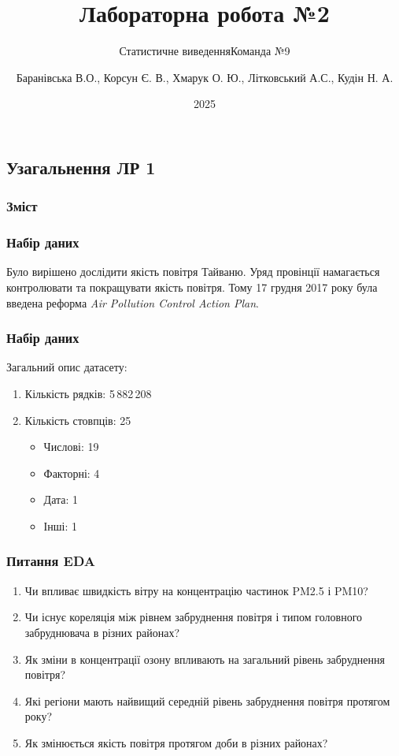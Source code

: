 \documentclass{beamer}
\title{Лабораторна робота №2}
\subtitle{Статистичне виведення}
\subtitle{Команда №9}
\author[]{
  Баранівська В.О.,
  Корсун Є. В.,
  Хмарук О. Ю.,
  Літковський А.С.,
  Кудін Н. А.
}
\date{2025}
\begin{document}
\frame{\titlepage}


\begin{frame}
  \section{Узагальнення ЛР 1}

  \frametitle{Зміст}
  \tableofcontents[currentsection]
\end{frame}

\begin{frame}
  \frametitle{Набір даних}

  Було вирішено дослідити якість повітря Тайваню. Уряд провінції намагається
  контролювати та покращувати якість повітря. Тому 17 грудня 2017 року була введена
  реформа \textit{Air Pollution Control Action Plan}.

  \begin{center}
    
  \end{center}
\end{frame}

\begin{frame}
  \frametitle{Набір даних}

  Загальний опис датасету:

  \begin{enumerate}
    \item Кількість рядків: 5\,882\,208
    \item Кількість стовпців: 25

    \begin{itemize}
      \item Числові: 19
      \item Факторні: 4
      \item Дата: 1
      \item Інші: 1
    \end{itemize}
  \end{enumerate}
\end{frame}

\begin{frame}
  \frametitle{Питання EDA}

  \begin{enumerate}
    \item Чи впливає швидкість вітру на концентрацію частинок PM2.5 і PM10?
    \item Чи існує кореляція між рівнем забруднення повітря і типом головного забруднювача
    в різних районах?
    \item Як зміни в концентрації озону  впливають на загальний рівень забруднення повітря?
    \item Які регіони мають найвищий середній рівень забруднення повітря протягом року?
    \item Як змінюється якість повітря протягом доби в різних районах?
  \end{enumerate}
\end{frame}
\end{document}
